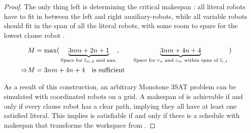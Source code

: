 \begin{proof}
	The only thing left is determining the critical makespan : all literal robots have to fit in between the left and right auxiliary-robots, while all variable robots should fit in the span of all the literal robots, with some room to spare for the lowest clause robot .

	\begin{align*}
		& M = \max (\, 
			\underbrace{3nm + 2n + 1}_{\text{Space for \( l_{m,3} \) and aux.}}, \qquad
			\underbrace{3nm + 4n + 4}_{\text{Space for \( r_n \) and \( c_m \) within span of \( l_{i,1} \)}}
		 \,) \\
		\Rightarrow & M = 3nm + 4n + 4 \quad \text{is sufficient}
	\end{align*}

	As a result of this construction, an arbitrary Monotone 3SAT problem can be simulated with coordinated robots on a grid. A makespan of  is achievable if and only if every clause robot has a clear path, implying they all have at least one satisfied literal. This implies \ilmath{\varphi} is satisfiable if and only if there is a schedule with makespan  that transforms the workspace from .
\end{proof}



